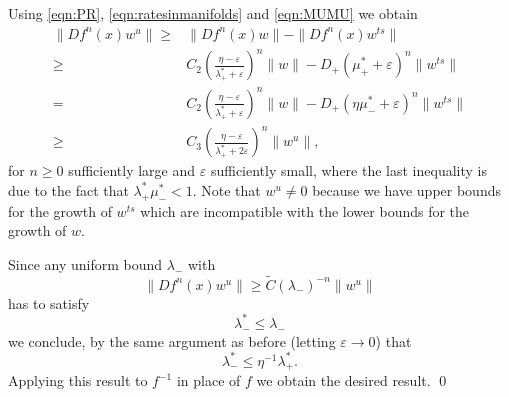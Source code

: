 \documentclass[11pt]{amsart}
\theoremstyle{definition}
\theoremstyle{remark}
\numberwithin{equation}{section}
\newcommand{\eps}{\varepsilon}
\begin{document}
Using \eqref{eqn:PR}, \ref{eqn:ratesinmanifolds} and \eqref{eqn:MUMU} we obtain
\begin{equation*}
\begin{split}
 \|Df^n(x) w^u  \| \ge & \|Df^n(x) w  \| - \|Df^n(x) w^{ts}  \| \\
 \ge& C_2 \left ( \frac{\eta-\eps}{\lambda_+^* +\eps} \right)^n \|w\| - D_+(\mu^*_+ +\eps)^n\|w^{ts}\|\\
 = &C_2 \left ( \frac{\eta-\eps}{\lambda_+^* +\eps} \right)^n \|w\| - D_+(\eta\mu^*_- +\eps)^n\|w^{ts}\| \\
 \ge & C_3 \left ( \frac{\eta-\eps}{\lambda_+^* +2\eps} \right)^n \|w^u\|,
\end{split}
\end{equation*}
for $n\ge 0$ sufficiently large and $\eps$ sufficiently small, where the last inequality is due to the fact that $\lambda^*_+\mu^*_-< 1$.
Note that $w^u \ne 0$ because we have upper bounds for the growth of $w^{ts}$ which are incompatible with the
lower bounds for the growth of $w$.

Since any uniform
bound $\lambda_-$ with
\[
\|Df^n(x) w^u\| \ge \tilde C (\lambda_-)^{-n} \|w^u\|
\]
has to satisfy
\[
\lambda_-^*\le \lambda_-
\]
we conclude,
by the same argument as before (letting $\eps\to 0$) that
\[
\lambda_-^*  \le \eta^{-1}    \lambda_+^* .
\]
Applying this result to $f^{-1}$ in place of $f$ we obtain the desired result.
\qed
\end{document}
